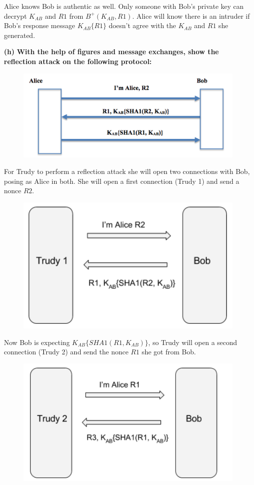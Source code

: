 \documentclass[11pt]{article}
\renewcommand\part[1]{\vspace{.10in}\textbf{(#1)}}
\begin{document}
Alice knows Bob is authentic as well. Only someone with Bob's private key can decrypt $K_{AB}$ and $R1$ from $B^+(K_{AB}, R1)$. Alice will know there is an intruder if Bob's response message $K_{AB}\{R1\}$ doesn't agree with the $K_{AB}$ and $R1$ she generated.

\part{h} \textbf{With the help of figures and message exchanges, show the reflection attack on the following protocol:}

\begin{figure}[H]
  \centerline{\includegraphics[width=0.5\linewidth]{3h_1.png}}
\end{figure}

For Trudy to perform a reflection attack she will open two connections with Bob, posing as Alice in both. She will open a first connection (Trudy 1) and send a nonce $R2$.

\begin{figure}[H]
  \centerline{\includegraphics[width=0.5\linewidth]{3h_2.png}}
\end{figure}

Now Bob is expecting $K_{AB}\{SHA1(R1, K_{AB})\}$, so Trudy will open a second connection (Trudy 2) and send the nonce $R1$ she got from Bob.

\begin{figure}[H]
  \centerline{\includegraphics[width=0.5\linewidth]{3h_3.png}}
\end{figure}
\end{document}

